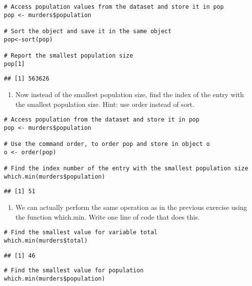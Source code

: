 \documentclass[
]{article}
\providecommand{\tightlist}{%
  \setlength{\itemsep}{0pt}\setlength{\parskip}{0pt}}
\begin{document}
\begin{verbatim}
# Access population values from the dataset and store it in pop
pop <- murders$population

# Sort the object and save it in the same object 
pop<-sort(pop)

# Report the smallest population size 
pop[1]
\end{verbatim}

\begin{verbatim}
## [1] 563626
\end{verbatim}

\begin{enumerate}
\def\labelenumi{\arabic{enumi}.}
\setcounter{enumi}{1}
\tightlist
\item
  Now instead of the smallest population size, find the index of the
  entry with the smallest population size. Hint: use order instead of
  sort.
\end{enumerate}

\begin{verbatim}
# Access population from the dataset and store it in pop
pop <- murders$population

# Use the command order, to order pop and store in object o
o <- order(pop)

# Find the index number of the entry with the smallest population size
which.min(murders$population)
\end{verbatim}

\begin{verbatim}
## [1] 51
\end{verbatim}

\begin{enumerate}
\def\labelenumi{\arabic{enumi}.}
\setcounter{enumi}{2}
\tightlist
\item
  We can actually perform the same operation as in the previous exercise
  using the function which.min. Write one line of code that does this.
\end{enumerate}

\begin{verbatim}
# Find the smallest value for variable total 
which.min(murders$total)
\end{verbatim}

\begin{verbatim}
## [1] 46
\end{verbatim}

\begin{verbatim}
# Find the smallest value for population
which.min(murders$population)
\end{verbatim}
\end{document}
